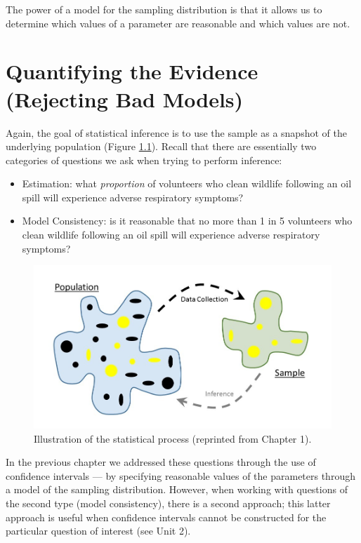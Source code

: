\documentclass[]{book}
\providecommand{\tightlist}{%
  \setlength{\itemsep}{0pt}\setlength{\parskip}{0pt}}
\theoremstyle{definition}
\theoremstyle{definition}
\theoremstyle{definition}
\theoremstyle{remark}
\begin{document}
The power of a model for the sampling distribution is that it allows us
to determine which values of a parameter are reasonable and which values
are not.

\chapter{Quantifying the Evidence (Rejecting Bad
Models)}\label{NullDistns}

Again, the goal of statistical inference is to use the sample as a
snapshot of the underlying population (Figure
\ref{fig:nulldistns-statistical-process}). Recall that there are
essentially two categories of questions we ask when trying to perform
inference:

\begin{itemize}
\tightlist
\item
  Estimation: what \emph{proportion} of volunteers who clean wildlife
  following an oil spill will experience adverse respiratory symptoms?
\item
  Model Consistency: is it reasonable that no more than 1 in 5
  volunteers who clean wildlife following an oil spill will experience
  adverse respiratory symptoms?
\end{itemize}

\begin{figure}

{\centering \includegraphics[width=0.8\linewidth]{images/Basics-Stat-Process} 

}

\caption{Illustration of the statistical process (reprinted from Chapter 1).}\label{fig:nulldistns-statistical-process}
\end{figure}

In the previous chapter we addressed these questions through the use of
confidence intervals --- by specifying reasonable values of the
parameters through a model of the sampling distribution. However, when
working with questions of the second type (model consistency), there is
a second approach; this latter approach is useful when confidence
intervals cannot be constructed for the particular question of interest
(see Unit 2).
\end{document}
